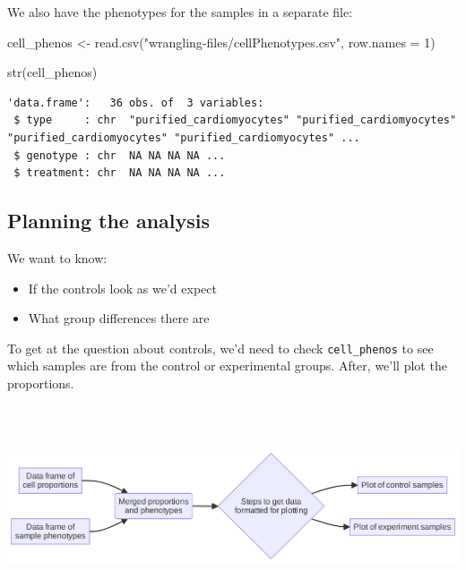 \documentclass[
  letterpaper,
  DIV=11,
  numbers=noendperiod]{scrreprt}
\newenvironment{Shaded}{\begin{snugshade}}{\end{snugshade}}
\newcommand{\AttributeTok}[1]{\textcolor[rgb]{0.40,0.45,0.13}{#1}}
\newcommand{\DecValTok}[1]{\textcolor[rgb]{0.68,0.00,0.00}{#1}}
\newcommand{\FunctionTok}[1]{\textcolor[rgb]{0.28,0.35,0.67}{#1}}
\newcommand{\NormalTok}[1]{\textcolor[rgb]{0.00,0.23,0.31}{#1}}
\newcommand{\OtherTok}[1]{\textcolor[rgb]{0.00,0.23,0.31}{#1}}
\newcommand{\StringTok}[1]{\textcolor[rgb]{0.13,0.47,0.30}{#1}}
\providecommand{\tightlist}{%
  \setlength{\itemsep}{0pt}\setlength{\parskip}{0pt}}\usepackage{longtable,booktabs,array}
\begin{document}
We also have the phenotypes for the samples in a separate file:

\begin{Shaded}
\begin{Highlighting}[]
\NormalTok{cell\_phenos }\OtherTok{\textless{}{-}} \FunctionTok{read.csv}\NormalTok{(}\StringTok{"wrangling{-}files/cellPhenotypes.csv"}\NormalTok{,}
                        \AttributeTok{row.names =} \DecValTok{1}\NormalTok{)}

\FunctionTok{str}\NormalTok{(cell\_phenos)}
\end{Highlighting}
\end{Shaded}

\begin{verbatim}
'data.frame':   36 obs. of  3 variables:
 $ type     : chr  "purified_cardiomyocytes" "purified_cardiomyocytes" "purified_cardiomyocytes" "purified_cardiomyocytes" ...
 $ genotype : chr  NA NA NA NA ...
 $ treatment: chr  NA NA NA NA ...
\end{verbatim}

\subsection{Planning the analysis}\label{planning-the-analysis}

We want to know:

\begin{itemize}
\tightlist
\item
  If the controls look as we'd expect
\item
  What group differences there are
\end{itemize}

To get at the question about controls, we'd need to check
\texttt{cell\_phenos} to see which samples are from the control or
experimental groups. After, we'll plot the proportions.

\includegraphics[width=9.27in,height=2.35in]{scripts/03_dataWrangling/class6_files/figure-latex/mermaid-figure-1.png}
\end{document}
